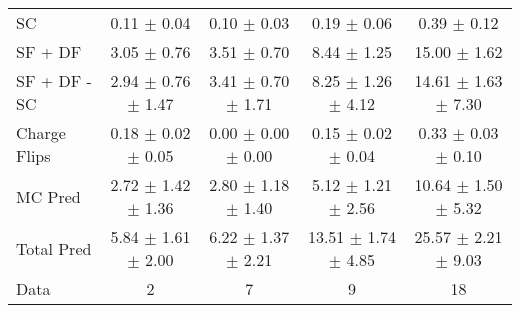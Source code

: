 \begin{tabular}{l|cccc}
                                 SC &  0.11 $\pm$  0.04 &  0.10 $\pm$  0.03 &  0.19 $\pm$  0.06 &  0.39 $\pm$  0.12 \\
                            SF + DF &  3.05 $\pm$  0.76 &  3.51 $\pm$  0.70 &  8.44 $\pm$  1.25 & 15.00 $\pm$  1.62 \\
\hline
                       SF + DF - SC &  2.94 $\pm$  0.76 $\pm$  1.47 &  3.41 $\pm$  0.70 $\pm$  1.71 &  8.25 $\pm$  1.26 $\pm$  4.12 & 14.61 $\pm$  1.63 $\pm$  7.30 \\
\hline\hline
                       Charge Flips &  0.18 $\pm$  0.02 $\pm$  0.05 &  0.00 $\pm$  0.00 $\pm$  0.00 &  0.15 $\pm$  0.02 $\pm$  0.04 &  0.33 $\pm$  0.03 $\pm$  0.10 \\
\hline
                            MC Pred &  2.72 $\pm$  1.42 $\pm$  1.36 &  2.80 $\pm$  1.18 $\pm$  1.40 &  5.12 $\pm$  1.21 $\pm$  2.56 & 10.64 $\pm$  1.50 $\pm$  5.32 \\
\hline
                         Total Pred &  5.84 $\pm$  1.61 $\pm$  2.00 &  6.22 $\pm$  1.37 $\pm$  2.21 & 13.51 $\pm$  1.74 $\pm$  4.85 & 25.57 $\pm$  2.21 $\pm$  9.03 \\
\hline\hline
                               Data &     2 &     7 &     9 &    18 \\
\hline\hline
\end{tabular}

